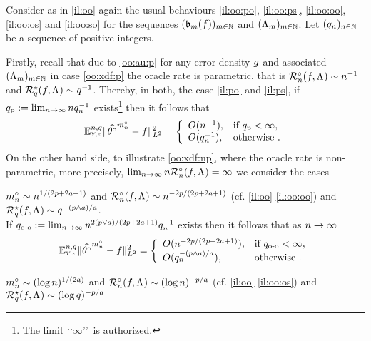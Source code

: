 \begin{il}\label{il:ee} Consider as in \cref{il:oo} again the usual behaviours
 \ref{il:oo:po}, \ref{il:oo:ps}, \ref{il:oo:oo}, \ref{il:oo:os} and \ref{il:oo:so} for the sequences
  $\Nsuite[\Di]{\bias(\xdf)}$ and  $\Nsuite[\Di]{\iSv[\Di]}$. Let
  $\Nsuite[\ssY]{\ssE_{\ssY}}$ be a sequence of positive integers. 

Firstly, recall that due to \eqref{oo:au:p} for any error density $\edf$ and associated $\Nsuite[\Di]{\iSv[\Di]}$ in case \ref{oo:xdf:p} the oracle rate is parametric, that is
$\oRa{\xdf,\iSv}\sim\ssY^{-1}$ and $\mRa{\xdf,\iSv}\sim\ssE^{-1}$. Thereby, in both, the case \ref{il:po}
and \ref{il:ps}, if
 $q_{\text{p}}:=\lim_{\ssY\to\infty}\ssY\ssE_{\ssY}^{-1}$ exists\footnote{The limit
   \lq\lq$\infty$\rq\rq\  is authorized.} then it follows that
\begin{equation}
\FuEx[\ssY,\ssE]{\rY,\rE}\VnormLp{\hxdfPr[\oDi{\ssY}]-\xdf}^2=\left\{\begin{array}{ll}
O(\ssY^{-1}),& \text{if }q_{\text{p}}<\infty,\\
O(\ssE_{\ssY}^{-1}),& \text{otherwise }.
\end{array}\right.
\end{equation}
On the other hand side, to illustrate \ref{oo:xdf:np}, where the oracle rate is
non-parametric, more precisely,
$\lim_{\ssY\to\infty}\ssY\oRa{\xdf,\iSv}=\infty$ we consider the  cases
\begin{Liste}[]
\item[\mylabel{il:ee:oo}{\dg\bfseries{[o-o]}}] 
 $\oDi{\ssY}\sim \ssY^{1/(2p+2a+1)}$ and
 $\oRa{\xdf,\iSv}\sim\ssY^{-2p/(2p+2a+1)}$ (cf. \cref{il:oo}
 \ref{il:oo:oo}) and $\mRa{\xdf,\iSv}\sim\ssE^{-(p\wedge a)/a}$.\\ If
 $q_{\text{o-o}}:=\lim_{\ssY\to\infty}\ssY^{2(p\vee
   a)/(2p+2a+1)}\ssE_{\ssY}^{-1}$ exists then it follows that as
 $\ssY\to\infty$
\begin{equation}
\FuEx[\ssY,\ssE]{\rY,\rE}\VnormLp{\hxdfPr[\oDi{\ssY}]-\xdf}^2=\left\{\begin{array}{ll}
O(\ssY^{-2p/(2p+2a+1)}),& \text{if }q_{\text{o-o}}<\infty,\\
O(\ssE_{\ssY}^{-(p\wedge a)/a}),& \text{otherwise }.
\end{array}\right.
\end{equation}
\item[\mylabel{il:ee:os}{\dg\bfseries{[o-s]}}]
 $\oDi{\ssY}\sim (\log\ssY)^{1/(2a)}$ and
 $\oRa{\xdf,\iSv}\sim(\log\ssY)^{-p/a}$ (cf. \cref{il:oo}
 \ref{il:oo:os}) and $\mRa{\xdf,\iSv}\sim(\log \ssE)^{-p/a}$\\

\end{Liste}
\end{il}
